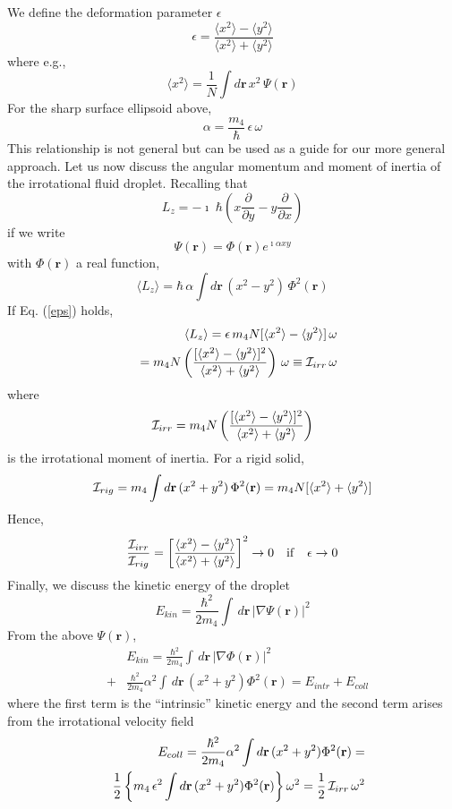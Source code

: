 We define the deformation parameter $\epsilon$
%
$$
\epsilon =\frac{\langle x^2 \rangle - \langle y^2 \rangle}{\langle x^2 \rangle + \langle y^2 \rangle}
$$
%
where e.g., 
$$ \langle x^2 \rangle = \frac{1}{N} \int d\mathbf{r} \,  x^2 \,\Psi(\mathbf{r}) $$
%
For the sharp surface ellipsoid above,
%
\begin{equation}
 \alpha = \frac{m_4}{\hbar} \, \epsilon \, \omega
 \label{eps}
 \end{equation}
%
This relationship is not  general but  can be used as a guide for our more general approach.
Let us  now discuss the angular momentum and moment of inertia of the irrotational fluid droplet. Recalling that
%
$$L_z = - \imath \; \hbar \left( x \frac{\partial}{\partial y} -  y \frac{\partial}{\partial x}\right)$$
%
if we write 
%
$$\Psi(\mathbf{r}) = \Phi(\mathbf{r}) e^{\imath \alpha xy}$$
%
with $\Phi(\mathbf{r})$ a real function,
%
$$\langle L_z \rangle = \hbar\,  \alpha  \int d\mathbf{r} \,  (x^2-y^2)  \,\Phi^2(\mathbf{r})$$
%
If Eq. (\ref{eps}) holds,
%
\begin{eqnarray}
&&\langle L_z \rangle = \epsilon \, m_4 N  [\langle x^2 \rangle - \langle y^2\rangle]\, \omega   
\nonumber
\\ 
&& = m_4  N \left( \frac{[\langle x^2 \rangle - \langle y^2\rangle ]^2}{\langle x^2 \rangle + \langle y^2\rangle} \right)\, \omega  \equiv  {\cal I}_{irr} \, \omega
 \label{irrot}
\end{eqnarray}
%
where 
%
$$ {\cal I}_{irr} = m_4 N \left( \frac{[\langle x^2 \rangle - \langle y^2\rangle ]^2}{\langle x^2 \rangle + \langle y^2\rangle} \right)$$
%
is the irrotational moment of inertia. For a rigid solid,
%
$$  {\cal I}_{rig} =  m_4  \int d\mathbf{r} \,  (x^2+y^2)  \,\Phi^2(\mathbf{r}) = m_4 N [\langle x^2 \rangle + \langle y^2\rangle] $$
%
Hence, 
%
$$ \frac{{\cal I}_{irr}}{{\cal I}_{rig}} = \left[ \frac{\langle x^2 \rangle - \langle y^2\rangle }{\langle x^2 \rangle + \langle y^2\rangle} \right]^2 \rightarrow 0 \quad {\rm if} \quad \epsilon \rightarrow 0$$
%
Finally, we discuss the kinetic energy of the droplet
%
$$ E_{kin} = \frac{\hbar^2}{2 m_4}  \int \, d\mathbf{r} \,|\nabla \Psi(\mathbf{r})|^2$$
%
From the above $\Psi(\mathbf{r})$, 
%
\begin{eqnarray}
&&E_{kin}= \frac{\hbar^2}{2 m_4}  \int \, d\mathbf{r} \,|\nabla \Phi(\mathbf{r})|^2
\nonumber
\\
\nonumber
&+& \frac{\hbar^2}{2 m_4} \alpha^2 \int \, d\mathbf{r} \, (x^2 + y^2) \Phi^2(\mathbf{r})= E_{intr}+E_{coll}
\end{eqnarray}
%
where the first term is the ``intrinsic'' kinetic energy and the second term arises from the irrotational velocity field
%
\begin{eqnarray}
&&E_{coll}= \frac{\hbar^2}{2 m_4} \alpha^2 \int  d\mathbf{r} \, (x^2 + y^2) \Phi^2(\mathbf{r}) =
\nonumber
\\
\nonumber
&& \frac{1}{2} \left\{ m_4\, \epsilon^2 \int d\mathbf{r} \, (x^2 + y^2) \Phi^2(\mathbf{r})\right\} \omega^2= \frac{1}{2}\, {\cal I}_{irr} \,\omega^2
 \end{eqnarray}
% 

